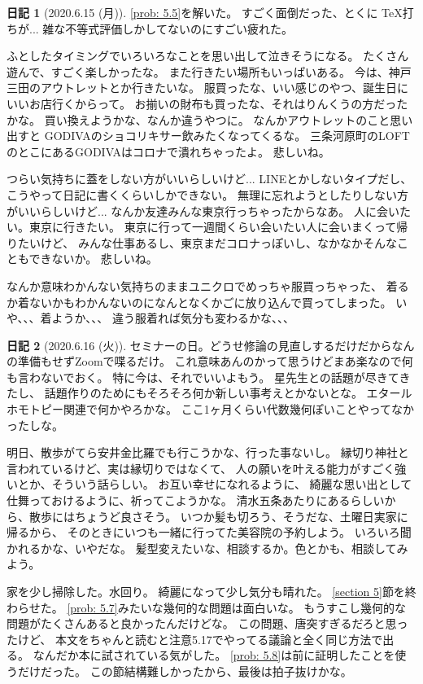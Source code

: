\documentclass[uplatex]{jsarticle}
\theoremstyle{definition}
\newtheorem*{nikki*}{日記}
\begin{document}
\begin{nikki*}[2020.6.15 (月)]
  \autoref{prob: 5.5}を解いた。
  すごく面倒だった、とくに \TeX 打ちが...
  雑な不等式評価しかしてないのにすごい疲れた。

  ふとしたタイミングでいろいろなことを思い出して泣きそうになる。
  たくさん遊んで、すごく楽しかったな。
  また行きたい場所もいっぱいある。
  今は、神戸三田のアウトレットとか行きたいな。
  服買ったな、いい感じのやつ、誕生日にいいお店行くからって。
  お揃いの財布も買ったな、それはりんくうの方だったかな。
  買い換えようかな、なんか違うやつに。
  なんかアウトレットのこと思い出すと
  GODIVAのショコリキサー飲みたくなってくるな。
  三条河原町のLOFTのとこにあるGODIVAはコロナで潰れちゃったよ。
  悲しいね。

  つらい気持ちに蓋をしない方がいいらしいけど...
  LINEとかしないタイプだし、
  こうやって日記に書くくらいしかできない。
  無理に忘れようとしたりしない方がいいらしいけど...
  なんか友達みんな東京行っちゃったからなあ。
  人に会いたい。東京に行きたい。
  東京に行って一週間くらい会いたい人に会いまくって帰りたいけど、
  みんな仕事あるし、東京まだコロナっぽいし、なかなかそんなこともできないか。
  悲しいね。

  なんか意味わかんない気持ちのままユニクロでめっちゃ服買っちゃった、
  着るか着ないかもわかんないのになんとなくかごに放り込んで買ってしまった。
  いや、、、着ようか、、、
  違う服着れば気分も変わるかな、、、
\end{nikki*}

\begin{nikki*}[2020.6.16 (火)]
  セミナーの日。どうせ修論の見直しするだけだからなんの準備もせずZoomで喋るだけ。
  これ意味あんのかって思うけどまあ楽なので何も言わないでおく。
  特に今は、それでいいよもう。
  星先生との話題が尽きてきたし、
  話題作りのためにもそろそろ何か新しい事考えとかないとな。
  エタールホモトピー関連で何かやろかな。
  ここ1ヶ月くらい代数幾何ぽいことやってなかったしな。

  明日、散歩がてら安井金比羅でも行こうかな、行った事ないし。
  縁切り神社と言われているけど、実は縁切りではなくて、
  人の願いを叶える能力がすごく強いとか、そういう話らしい。
  お互い幸せになれるように、
  綺麗な思い出として仕舞っておけるように、祈ってこようかな。
  清水五条あたりにあるらしいから、散歩にはちょうど良さそう。
  いつか髪も切ろう、そうだな、土曜日実家に帰るから、
  そのときにいつも一緒に行ってた美容院の予約しよう。
  いろいろ聞かれるかな、いやだな。
  髪型変えたいな、相談するか。色とかも、相談してみよう。

  家を少し掃除した。水回り。
  綺麗になって少し気分も晴れた。
  \ref{section 5}節を終わらせた。
  \autoref{prob: 5.7}みたいな幾何的な問題は面白いな。
  もうすこし幾何的な問題がたくさんあると良かったんだけどな。
  この問題、唐突すぎるだろと思ったけど、
  本文をちゃんと読むと注意5.17でやってる議論と全く同じ方法で出る。
  なんだか本に試されている気がした。
  \autoref{prob: 5.8}は前に証明したことを使うだけだった。
  この節結構難しかったから、最後は拍子抜けかな。
\end{nikki*}
\end{document}
